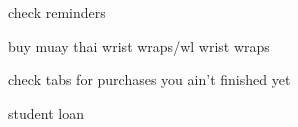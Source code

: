 check reminders

buy muay thai wrist wraps/wl wrist wraps

check tabs for purchases you ain't finished yet

student loan
